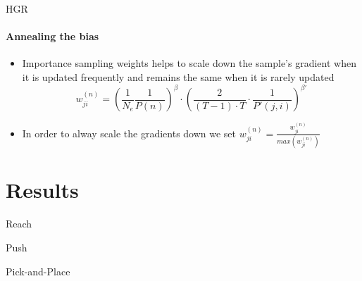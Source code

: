 \documentclass{beamer}
\begin{document}
      \begin{frame}{HGR}
            \framesubtitle{Annealing the bias}
            \begin{itemize}
                  \item Importance sampling weights helps to scale down the sample’s gradient when it is updated frequently and remains the same when it is rarely updated
                  \begin{equation}
                        w_{ji}^{(n)} = \left( \frac{1}{N_e}\frac{1}{P(n)}\right) ^{\beta} \cdot \left( \frac{2}{(T-1)\cdot T} \cdot \frac{1}{P'(j,i)}\right) ^ {\beta'}
                  \end{equation}
                  \item In order to alway scale the gradients down we set $w_{ji}^{(n)} = \frac{w_{ji}^{(n)}}{max(w_{ji}^{(n)})}$
            \end{itemize}
            
      \end{frame}


\section{Results}

      \begin{frame}[fragile]{Reach}
            \begin{figure}
            \end{figure}
      \end{frame}

      \begin{frame}{Push}
            
      \end{frame}

      \begin{frame}{Pick-and-Place}
            
      \end{frame}

\backmatter
\end{document}
